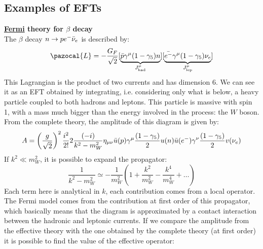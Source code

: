 \documentclass[../main.tex]{subfiles}
\begin{document}
\subsection{Examples of EFTs}
\begin{example}\textbf{\href{https://en.wikipedia.org/wiki/Enrico_Fermi}{Fermi} theory for $\beta$ decay}\\
The $\beta$ decay $n\to pe^-\Bar{\nu}_e$ is described by:
\[
\pazocal{L}=-\frac{G_F}{\sqrt{2}}[\underbrace{\Bar{p}\gamma^\mu(1-\gamma_5)n}_{J^{\mu}_{\text{had}}}][\underbrace{\Bar{e^-}\gamma^\mu(1-\gamma_5)\nu_e}_{J^{\mu}_{\text{lep}}}]
\]
This Lagrangian is the product of two currents and has dimension 6. We can see it as an EFT obtained by integrating, i.e. considering only what is below, a heavy particle coupled to both hadrons and leptons. This particle is massive with spin 1, with a mass much bigger than the energy involved in the process: the $W$ boson.\\
From the complete theory, the amplitude of this diagram is given by:
\[
A=\left(\frac{g}{\sqrt{2}}\right)^2\frac{i^2}{2!}2\frac{(-i)}{k^2-m_W^2}\eta_{\mu\nu}\Bar{u}(p)\gamma^\mu\frac{(1-\gamma_5)}{2}u(n)\Bar{u}(e^-)\gamma^\nu\frac{(1-\gamma_5)}{2}v(\nu_e)
\]
If $k^2\ll m_W^2$, it is possible to expand the propagator:
\[
\frac{1}{k^2-m_W^2}\simeq-\frac{1}{m_W^2}\left(1+\frac{k^2}{m_W^2}-\frac{k^4}{m_W^4}+\dots\right)
\]
Each term here is analytical in $k$, each contribution comes from a local operator. The Fermi model comes from the contribution at first order of this propagator, which basically means that the diagram is approximated by a contact interaction between the hadronic and leptonic currents. If we compare the amplitude from the effective theory with the one obtained by the complete theory (at first order) it is possible to find the value of the effective operator:

\end{example}
\end{document}
